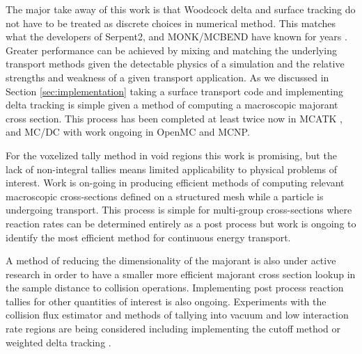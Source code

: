 The major take away of this work is that Woodcock delta and surface tracking do not have to be treated as discrete choices in numerical method.
This matches what the developers of Serpent2, and MONK/MCBEND have known for years \cite{leppanen_use_2017, richards_monk_2015}.
Greater performance can be achieved by mixing and matching the underlying transport methods given the detectable physics of a simulation and the relative strengths and weakness of a given transport application.
As we discussed in Section \ref{sec:implementation} taking a surface transport code and implementing delta tracking is simple given a method of computing a macroscopic majorant cross section.
This process has been completed at least twice now in MCATK \cite{morgan2023delta}, and MC/DC with work ongoing in OpenMC and MCNP. %

For the voxelized tally method in void regions this work is promising, but the lack of non-integral tallies means limited applicability to physical problems of interest.
Work is on-going in producing efficient methods of computing relevant macroscopic cross-sections defined on a structured mesh while a particle is undergoing transport.
This process is simple for multi-group cross-sections where reaction rates can be determined entirely as a post process but work is ongoing to identify the most efficient method for continuous energy transport.

A method of reducing the dimensionality of the majorant is also under active research in order to have a smaller more efficient majorant cross section lookup in the sample distance to collision operations.
Implementing post process reaction tallies for other quantities of interest is also ongoing.
Experiments with the collision flux estimator and methods of tallying into vacuum and low interaction rate regions are being considered including implementing the cutoff method \cite{leppanen_2010_burnup} or weighted delta tracking \cite{morgan_weighted-delta-tracking_2015}.



